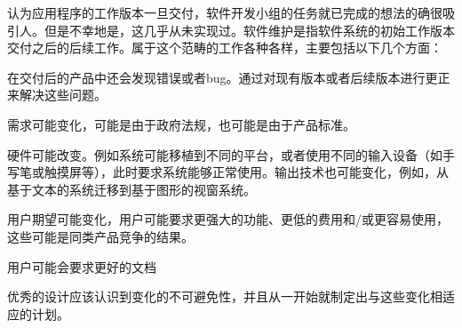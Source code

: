 认为应用程序的工作版本一旦交付，软件开发小组的任务就已完成的想法的确很吸引人。但是不幸地是，这几乎从未实现过。软件维护是指软件系统的初始工作版本交付之后的后续工作。属于这个范畴的工作各种各样，主要包括以下几个方面：


\begin{compactitem}
\item 在交付后的产品中还会发现错误或者bug。通过对现有版本或者后续版本进行更正来解决这些问题。
\item 需求可能变化，可能是由于政府法规，也可能是由于产品标准。
\item 硬件可能改变。例如系统可能移植到不同的平台，或者使用不同的输入设备（如手写笔或触摸屏等），此时要求系统能够正常使用。输出技术也可能变化，例如，从基于文本的系统迁移到基于图形的视窗系统。
\item 用户期望可能变化，用户可能要求更强大的功能、更低的费用和/或更容易使用，这些可能是同类产品竞争的结果。
\item 用户可能会要求更好的文档
\end{compactitem}

优秀的设计应该认识到变化的不可避免性，并且从一开始就制定出与这些变化相适应的计划。
















